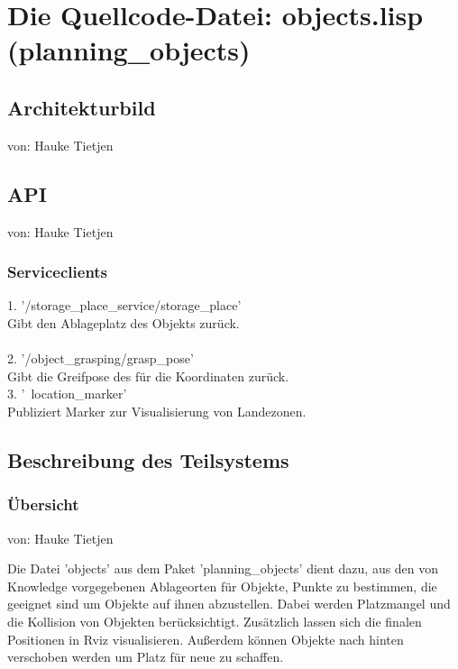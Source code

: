 \documentclass{suturo}
\makeatletter
\newcommand{\chapterauthor}[1]{%
  {\parindent0pt\vspace*{-27pt}%
  \linespread{0}\small\begin{flushright}von: #1\end{flushright}%
  \par\nobreak\vspace*{0pt}}
  \@afterheading%
}
\makeatother
\begin{document}
\section{Die Quellcode-Datei: objects.lisp (planning\_objects)}
\subsection{Architekturbild}
\chapterauthor{Hauke Tietjen}



\begin{figure}[!htb]
\end{figure}


\subsection{API}
\chapterauthor{Hauke Tietjen}
\subsubsection{Serviceclients}
1. '/storage\_place\_service/storage\_place' \\
Gibt den Ablageplatz des Objekts zur\"uck.\\ \\
2. '/object\_grasping/grasp\_pose' \\
Gibt die Greifpose des für die Koordinaten zurück.\\
3. '~location\_marker' \\
Publiziert Marker zur Visualisierung von Landezonen.
\subsection{Beschreibung des Teilsystems}
\subsubsection{\"Ubersicht}
\chapterauthor{Hauke Tietjen}
Die Datei 'objects' aus dem Paket 'planning\_objects' dient dazu, aus den von Knowledge vorgegebenen Ablageorten für Objekte, Punkte zu bestimmen, die geeignet sind um Objekte auf ihnen abzustellen. Dabei werden Platzmangel und die Kollision von Objekten berücksichtigt. Zusätzlich lassen sich die finalen Positionen in Rviz visualisieren. Außerdem können Objekte nach hinten verschoben werden um Platz für neue zu schaffen.
\end{document}
